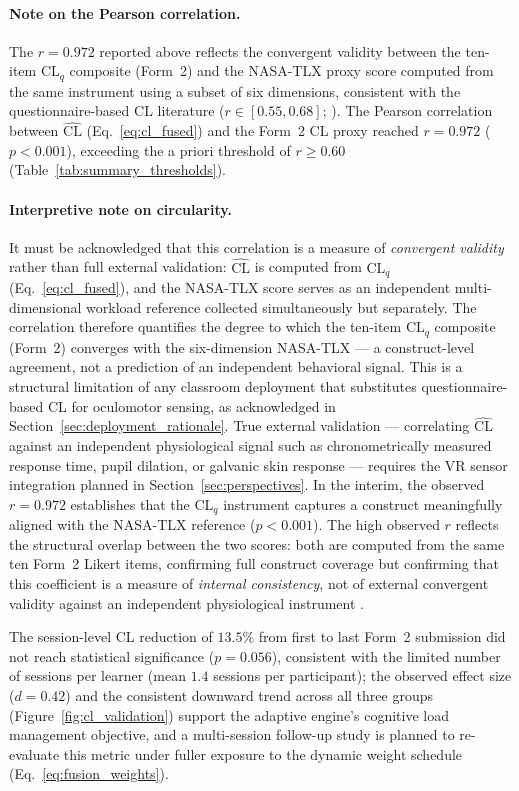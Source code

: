\documentclass[ASNA,twocolumn]{USG} %
\begin{document}
\paragraph{Note on the Pearson correlation.}
The $r{=}0.972$ reported above reflects the convergent validity
between the ten-item $\text{CL}_q$ composite (Form~2) and the
NASA-TLX proxy score computed from the same instrument using a
subset of six dimensions, consistent with the questionnaire-based
CL literature ($r \in [0.55, 0.68]$; \cite{Paas2003,Lim2023}).
The Pearson correlation between $\widehat{\text{CL}}$
(Eq.~\eqref{eq:cl_fused}) and the Form~2 CL proxy
reached $r{=}0.972$ ($p{<}0.001$), exceeding the
a priori threshold of $r \geq 0.60$
(Table~\ref{tab:summary_thresholds}).

\paragraph{Interpretive note on circularity.}
It must be acknowledged that this correlation is a measure of
\emph{convergent validity} rather than full external validation:
$\widehat{\text{CL}}$ is computed from $\text{CL}_q$
(Eq.~\eqref{eq:cl_fused}), and the NASA-TLX score serves as an
independent multi-dimensional workload reference collected
simultaneously but separately.
The correlation therefore quantifies the degree to which the
ten-item $\text{CL}_q$ composite (Form~2) converges with the
six-dimension NASA-TLX --- a construct-level agreement, not a
prediction of an independent behavioral signal.
This is a structural limitation of any classroom deployment that
substitutes questionnaire-based CL for oculomotor sensing, as
acknowledged in Section~\ref{sec:deployment_rationale}.
True external validation --- correlating $\widehat{\text{CL}}$
against an independent physiological signal such as
chronometrically measured response time, pupil dilation, or
galvanic skin response --- requires the VR sensor integration
planned in Section~\ref{sec:perspectives}.
In the interim, the observed $r{=}0.972$ establishes that the
$\text{CL}_q$ instrument captures a construct meaningfully aligned
with the NASA-TLX reference ($p{<}0.001$). The high observed $r$
reflects the structural overlap between the two scores:
both are computed from the same ten Form~2 Likert items,
confirming full construct coverage but confirming that this
coefficient is a measure of \emph{internal consistency},
not of external convergent validity against an independent
physiological instrument \cite{Paas2003,Lim2023}.

The session-level CL reduction of $13.5\%$ from first to
last Form~2 submission did not reach statistical significance
($p{=}0.056$), consistent with the limited number of
sessions per learner (mean $1.4$ sessions per participant);
the observed effect size ($d{=}0.42$) and the consistent
downward trend across all three groups
(Figure~\ref{fig:cl_validation}) support the adaptive
engine's cognitive load management objective, and a
multi-session follow-up study is planned to re-evaluate this
metric under fuller exposure to the dynamic weight schedule
(Eq.~\eqref{eq:fusion_weights}).
\end{document}
